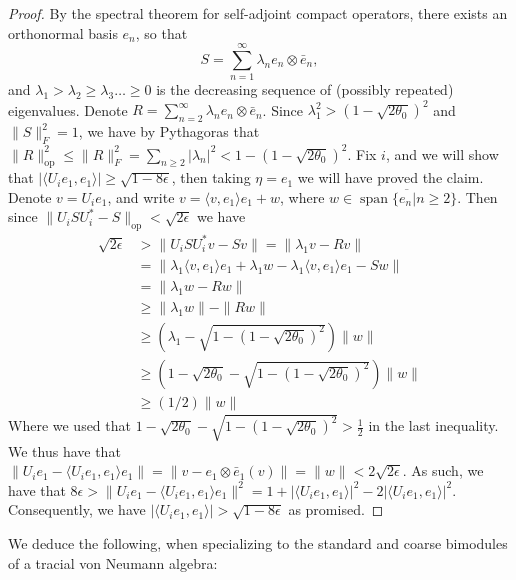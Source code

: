 \documentclass[11pt]{amsart}
\DeclareMathOperator{\spam}{span}
\DeclareMathOperator{\op}{op}
\theoremstyle{definition}
\theoremstyle{remark}
\theoremstyle{definition}
\begin{document}
\begin{proof}
    
       By the spectral theorem for self-adjoint compact operators, there exists an orthonormal basis $e_n$, so that $$S = \sum_{n=1}^\infty \lambda_n e_n \otimes \bar{e}_n,$$ and $\lambda_1 > \lambda_2 \geq\lambda_3 \dots\geq 0$  is the decreasing  sequence of (possibly repeated) eigenvalues.  Denote $R=\sum_{n=2}^\infty \lambda_ne_n\otimes \bar e_n$. Since $\lambda_1^2> (1-\sqrt{2\theta_0})^2$ and $\|S\|_F^2=1$, we have by Pythagoras that $\| R \|_{\op}^2 \leq \|R\|_F^2=\sum_{n\geq 2} |\lambda_n|^2<1-(1-\sqrt{2\theta_0})^2$.
       Fix $i$, and we will show that $|\langle U_ie_1, e_1\rangle| \geq \sqrt{1-8\epsilon}$, then taking $\eta = e_1$ we will have proved the claim.
       Denote  $v = U_ie_1$, and write $v = \langle v,e_1 \rangle e_1  + w$, where $w \in \overline{\spam\{e_n | n \geq 2\}}$. 
       Then since $\| U_i S U_i^* - S \|_{\op} < \sqrt{2\epsilon}$ we have 
       \begin{align*}
           \sqrt{2\epsilon}&> \|U_iSU_i^*v - Sv \| =\|\lambda_1 v - Rv \|\\
           &= \| \lambda_1  \langle v,e_1 \rangle e_1  + \lambda_1w  - \lambda_1  \langle v,e_1 \rangle e_1  - Sw \| \\
           &= \| \lambda_1w - Rw \|\\
           &\geq \|\lambda_1w\| - \|Rw\| \\
           &\geq (\lambda_1 - \sqrt{1-(1-\sqrt{2\theta_0})^2})\| w\|\\
           &\geq (1 - \sqrt{2\theta_0} -\sqrt{1-(1-\sqrt{2\theta_0})^2}) \|w\|\\
           &\geq (1/2) \| w\|
       \end{align*}
   Where we used that $1 - \sqrt{2\theta_0} -\sqrt{1-(1-\sqrt{2\theta_0})^2} > \frac{1}{2}$ in the last inequality. We thus have that $\| U_ie_1 - \langle U_ie_1,e_1 \rangle e_1\| = \| v - e_1\otimes \bar e_1(v) \|= \|w\| < 2 \sqrt{2\epsilon}$.
   As such, we have that $8\epsilon> \| U_ie_1 - \langle U_ie_1,e_1 \rangle e_1\|^2 = 1 + |\langle U_ie_1,e_1  \rangle |^2 - 2|\langle U_i e_1, e_1 \rangle|^2$.
   Consequently, we have $|\langle U_i e_1, e_1 \rangle| > \sqrt{1- 8\epsilon}$ as promised. 
   \end{proof}

We deduce the following, when specializing to the standard and coarse bimodules of a tracial von Neumann algebra:
\end{document}
